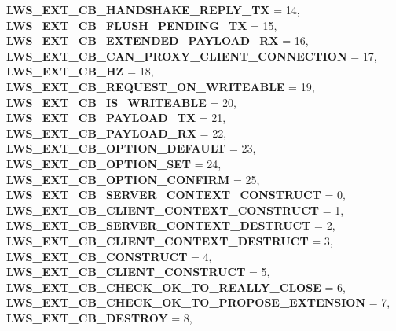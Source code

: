 \begin{DoxyCompactItemize}
{\bfseries L\+W\+S\+\_\+\+E\+X\+T\+\_\+\+C\+B\+\_\+\+H\+A\+N\+D\+S\+H\+A\+K\+E\+\_\+\+R\+E\+P\+L\+Y\+\_\+\+TX} = 14, 
{\bfseries L\+W\+S\+\_\+\+E\+X\+T\+\_\+\+C\+B\+\_\+\+F\+L\+U\+S\+H\+\_\+\+P\+E\+N\+D\+I\+N\+G\+\_\+\+TX} = 15, 
\newline
{\bfseries L\+W\+S\+\_\+\+E\+X\+T\+\_\+\+C\+B\+\_\+\+E\+X\+T\+E\+N\+D\+E\+D\+\_\+\+P\+A\+Y\+L\+O\+A\+D\+\_\+\+RX} = 16, 
{\bfseries L\+W\+S\+\_\+\+E\+X\+T\+\_\+\+C\+B\+\_\+\+C\+A\+N\+\_\+\+P\+R\+O\+X\+Y\+\_\+\+C\+L\+I\+E\+N\+T\+\_\+\+C\+O\+N\+N\+E\+C\+T\+I\+ON} = 17, 
{\bfseries L\+W\+S\+\_\+\+E\+X\+T\+\_\+\+C\+B\+\_\+HZ} = 18, 
{\bfseries L\+W\+S\+\_\+\+E\+X\+T\+\_\+\+C\+B\+\_\+\+R\+E\+Q\+U\+E\+S\+T\+\_\+\+O\+N\+\_\+\+W\+R\+I\+T\+E\+A\+B\+LE} = 19, 
\newline
{\bfseries L\+W\+S\+\_\+\+E\+X\+T\+\_\+\+C\+B\+\_\+\+I\+S\+\_\+\+W\+R\+I\+T\+E\+A\+B\+LE} = 20, 
{\bfseries L\+W\+S\+\_\+\+E\+X\+T\+\_\+\+C\+B\+\_\+\+P\+A\+Y\+L\+O\+A\+D\+\_\+\+TX} = 21, 
{\bfseries L\+W\+S\+\_\+\+E\+X\+T\+\_\+\+C\+B\+\_\+\+P\+A\+Y\+L\+O\+A\+D\+\_\+\+RX} = 22, 
{\bfseries L\+W\+S\+\_\+\+E\+X\+T\+\_\+\+C\+B\+\_\+\+O\+P\+T\+I\+O\+N\+\_\+\+D\+E\+F\+A\+U\+LT} = 23, 
\newline
{\bfseries L\+W\+S\+\_\+\+E\+X\+T\+\_\+\+C\+B\+\_\+\+O\+P\+T\+I\+O\+N\+\_\+\+S\+ET} = 24, 
{\bfseries L\+W\+S\+\_\+\+E\+X\+T\+\_\+\+C\+B\+\_\+\+O\+P\+T\+I\+O\+N\+\_\+\+C\+O\+N\+F\+I\+RM} = 25, 
{\bfseries L\+W\+S\+\_\+\+E\+X\+T\+\_\+\+C\+B\+\_\+\+S\+E\+R\+V\+E\+R\+\_\+\+C\+O\+N\+T\+E\+X\+T\+\_\+\+C\+O\+N\+S\+T\+R\+U\+CT} = 0, 
{\bfseries L\+W\+S\+\_\+\+E\+X\+T\+\_\+\+C\+B\+\_\+\+C\+L\+I\+E\+N\+T\+\_\+\+C\+O\+N\+T\+E\+X\+T\+\_\+\+C\+O\+N\+S\+T\+R\+U\+CT} = 1, 
\newline
{\bfseries L\+W\+S\+\_\+\+E\+X\+T\+\_\+\+C\+B\+\_\+\+S\+E\+R\+V\+E\+R\+\_\+\+C\+O\+N\+T\+E\+X\+T\+\_\+\+D\+E\+S\+T\+R\+U\+CT} = 2, 
{\bfseries L\+W\+S\+\_\+\+E\+X\+T\+\_\+\+C\+B\+\_\+\+C\+L\+I\+E\+N\+T\+\_\+\+C\+O\+N\+T\+E\+X\+T\+\_\+\+D\+E\+S\+T\+R\+U\+CT} = 3, 
{\bfseries L\+W\+S\+\_\+\+E\+X\+T\+\_\+\+C\+B\+\_\+\+C\+O\+N\+S\+T\+R\+U\+CT} = 4, 
{\bfseries L\+W\+S\+\_\+\+E\+X\+T\+\_\+\+C\+B\+\_\+\+C\+L\+I\+E\+N\+T\+\_\+\+C\+O\+N\+S\+T\+R\+U\+CT} = 5, 
\newline
{\bfseries L\+W\+S\+\_\+\+E\+X\+T\+\_\+\+C\+B\+\_\+\+C\+H\+E\+C\+K\+\_\+\+O\+K\+\_\+\+T\+O\+\_\+\+R\+E\+A\+L\+L\+Y\+\_\+\+C\+L\+O\+SE} = 6, 
{\bfseries L\+W\+S\+\_\+\+E\+X\+T\+\_\+\+C\+B\+\_\+\+C\+H\+E\+C\+K\+\_\+\+O\+K\+\_\+\+T\+O\+\_\+\+P\+R\+O\+P\+O\+S\+E\+\_\+\+E\+X\+T\+E\+N\+S\+I\+ON} = 7, 
{\bfseries L\+W\+S\+\_\+\+E\+X\+T\+\_\+\+C\+B\+\_\+\+D\+E\+S\+T\+R\+OY} = 8, 

\end{DoxyCompactItemize}
